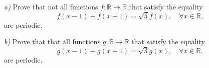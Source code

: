 \textit{a)} Prove that not all functions $ f:\mathbb{R}\longrightarrow\mathbb{R} $ that satisfy the equality
$$ f(x-1)+f(x+1) =\sqrt 5f(x) ,\quad\forall x\in\mathbb{R} , $$are periodic.

\textit{b)} Prove that that all functions $ g:\mathbb{R}\longrightarrow\mathbb{R} $ that satisfy the equality
$$ g(x-1)+g(x+1)=\sqrt 3g(x) ,\quad\forall x\in\mathbb{R} , $$are periodic.